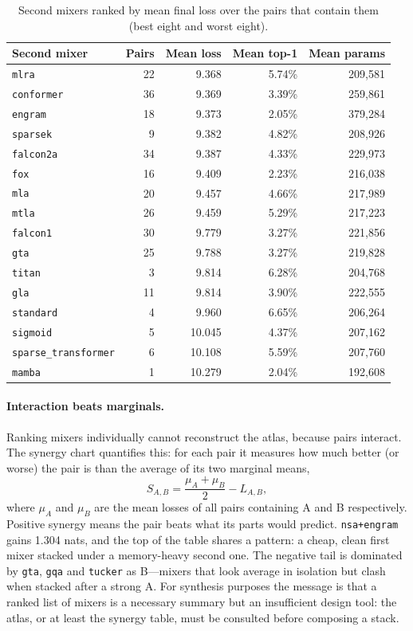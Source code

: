 \begin{table}[H]
\centering
\small
\caption{Second mixers ranked by mean final loss over the pairs that contain them (best eight and worst eight).}
\label{tab:r2-best-b}
\begin{tabular}{lrrrr}
\toprule
Second mixer & Pairs & Mean loss & Mean top-1 & Mean params \\
\midrule
\texttt{mlra}        & 22 & 9.368 & 5.74\% & 209{,}581 \\
\texttt{conformer}   & 36 & 9.369 & 3.39\% & 259{,}861 \\
\texttt{engram}      & 18 & 9.373 & 2.05\% & 379{,}284 \\
\texttt{sparsek}     & 9  & 9.382 & 4.82\% & 208{,}926 \\
\texttt{falcon2a}    & 34 & 9.387 & 4.33\% & 229{,}973 \\
\texttt{fox}         & 16 & 9.409 & 2.23\% & 216{,}038 \\
\texttt{mla}         & 20 & 9.457 & 4.66\% & 217{,}989 \\
\texttt{mtla}        & 26 & 9.459 & 5.29\% & 217{,}223 \\
\midrule
\texttt{falcon1}     & 30 & 9.779 & 3.27\% & 221{,}856 \\
\texttt{gta}         & 25 & 9.788 & 3.27\% & 219{,}828 \\
\texttt{titan}       & 3  & 9.814 & 6.28\% & 204{,}768 \\
\texttt{gla}         & 11 & 9.814 & 3.90\% & 222{,}555 \\
\texttt{standard}    & 4  & 9.960 & 6.65\% & 206{,}264 \\
\texttt{sigmoid}     & 5  & 10.045 & 4.37\% & 207{,}162 \\
\texttt{sparse\_transformer} & 6 & 10.108 & 5.59\% & 207{,}760 \\
\texttt{mamba}       & 1  & 10.279 & 2.04\% & 192{,}608 \\
\bottomrule
\end{tabular}
\end{table}

\paragraph{Interaction beats marginals.}
Ranking mixers individually cannot reconstruct the atlas, because pairs interact. The synergy chart quantifies this: for each pair it measures how much better (or worse) the pair is than the average of its two marginal means,
\[
S_{A,B} = \frac{\mu_A + \mu_B}{2} - L_{A,B},
\]
where $\mu_A$ and $\mu_B$ are the mean losses of all pairs containing A and B respectively. Positive synergy means the pair beats what its parts would predict. \texttt{nsa+engram} gains 1.304 nats, and the top of the table shares a pattern: a cheap, clean first mixer stacked under a memory-heavy second one. The negative tail is dominated by \texttt{gta}, \texttt{gqa} and \texttt{tucker} as B---mixers that look average in isolation but clash when stacked after a strong A. For synthesis purposes the message is that a ranked list of mixers is a necessary summary but an insufficient design tool: the atlas, or at least the synergy table, must be consulted before composing a stack.


